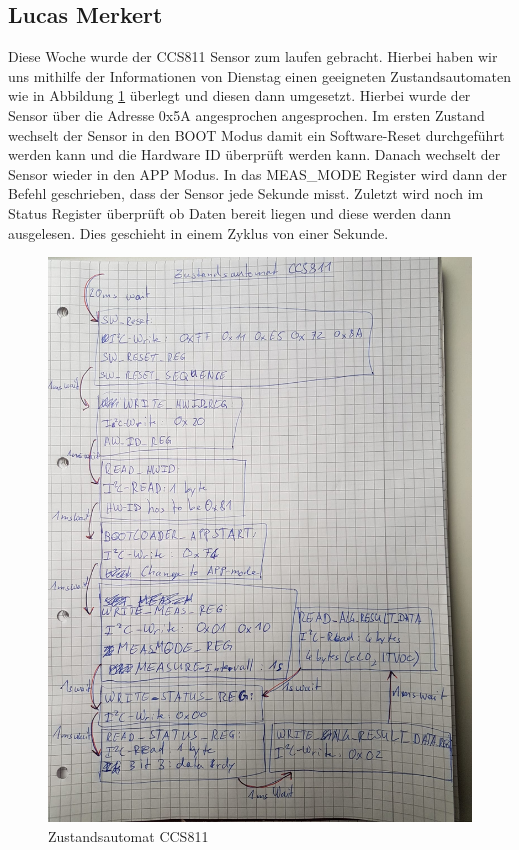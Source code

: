 \documentclass[]{article}
\begin{document}
\subsection{Lucas Merkert}
Diese Woche wurde der CCS811 Sensor zum laufen gebracht. Hierbei haben wir uns mithilfe der Informationen von Dienstag einen geeigneten Zustandsautomaten wie in Abbildung \ref{img:Zustandsautomat} überlegt und diesen dann umgesetzt. Hierbei wurde der Sensor über die Adresse 0x5A angesprochen angesprochen. Im ersten Zustand wechselt der Sensor in den BOOT Modus damit ein Software-Reset durchgeführt werden kann und die Hardware ID überprüft werden kann. Danach wechselt der Sensor wieder in den APP Modus. In das MEAS\_MODE Register wird dann der Befehl geschrieben, dass der Sensor jede Sekunde misst. Zuletzt wird noch im Status Register überprüft ob Daten bereit liegen und diese werden dann ausgelesen. Dies geschieht in einem Zyklus von einer Sekunde.

\begin{figure}[h]
	\centering
	\includegraphics[scale=0.20]{images/zustandsautomat_ccs811}
	\caption{Zustandsautomat CCS811}
	\label{img:Zustandsautomat}
\end{figure}
\end{document}
